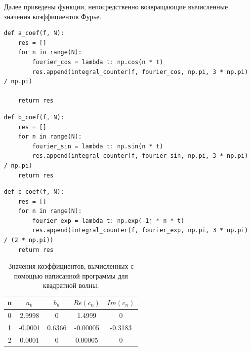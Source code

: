 \documentclass[a5paper, 10pt]{article}
\theoremstyle{definition}
\theoremstyle{plain}
\theoremstyle{remark}
\begin{document}
Далее приведены функции, непосредственно возвращающие вычисленные значения коэффициентов Фурье.

\begin{center}
\begin{lstlisting}[label=some-code,caption={Функция для коэффициентов $a_n$}]
def a_coef(f, N):
    res = []
    for n in range(N):
        fourier_cos = lambda t: np.cos(n * t)
        res.append(integral_counter(f, fourier_cos, np.pi, 3 * np.pi) / np.pi)

    return res
\end{lstlisting}
\end{center}


\begin{center}
\begin{lstlisting}[label=some-code,caption={Функция для коэффициентов $b_n$}]
def b_coef(f, N):
    res = []
    for n in range(N):
        fourier_sin = lambda t: np.sin(n * t)
        res.append(integral_counter(f, fourier_sin, np.pi, 3 * np.pi) / np.pi)
    return res
\end{lstlisting}
\end{center}


\begin{center}
\begin{lstlisting}[label=some-code,caption={Функция для коэффициентов $c_n$}]
def c_coef(f, N):
    res = []
    for n in range(N):
        fourier_exp = lambda t: np.exp(-1j * n * t)
        res.append(integral_counter(f, fourier_exp, np.pi, 3 * np.pi) / (2 * np.pi))
    return res
\end{lstlisting}
\end{center}

\begin{table}[h]
\caption{Значения коэффициентов, вычисленных с помощью написанной программы для квадратной волны.}
\label{tabular:timesandtenses}
\begin{center}
\begin{tabular}{|c|c|c|c|c|}
\hline
n & $a_n$ & $b_n$ & $Re(c_n)$ & $Im(c_n)$ \\
\hline
0 & 2.9998 & 0 & 1.4999 & 0\\
\hline
1 & -0.0001 & 0.6366 & -0.00005 & -0.3183\\
\hline
2 & 0.0001 & 0 & 0.00005  & 0\\
\hline
\end{tabular}
\end{center}
\end{table}
\end{document}
